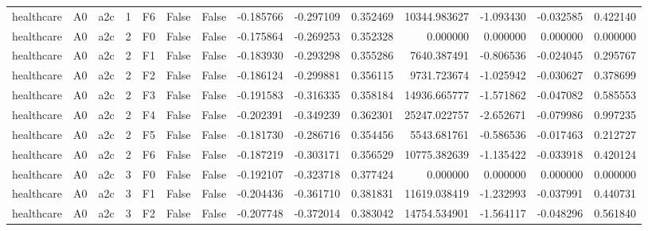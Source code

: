 \begin{tabular}{lllrlllrrrrrrr}
healthcare &      A0 &       a2c &     1 &  F6 &           False &            False & -0.185766 & -0.297109 & 0.352469 &     10344.983627 &          -1.093430 &       -0.032585 &            0.422140 \\
healthcare &      A0 &       a2c &     2 &  F0 &           False &            False & -0.175864 & -0.269253 & 0.352328 &         0.000000 &           0.000000 &        0.000000 &            0.000000 \\
healthcare &      A0 &       a2c &     2 &  F1 &           False &            False & -0.183930 & -0.293298 & 0.355286 &      7640.387491 &          -0.806536 &       -0.024045 &            0.295767 \\
healthcare &      A0 &       a2c &     2 &  F2 &           False &            False & -0.186124 & -0.299881 & 0.356115 &      9731.723674 &          -1.025942 &       -0.030627 &            0.378699 \\
healthcare &      A0 &       a2c &     2 &  F3 &           False &            False & -0.191583 & -0.316335 & 0.358184 &     14936.665777 &          -1.571862 &       -0.047082 &            0.585553 \\
healthcare &      A0 &       a2c &     2 &  F4 &           False &            False & -0.202391 & -0.349239 & 0.362301 &     25247.022757 &          -2.652671 &       -0.079986 &            0.997235 \\
healthcare &      A0 &       a2c &     2 &  F5 &           False &            False & -0.181730 & -0.286716 & 0.354456 &      5543.681761 &          -0.586536 &       -0.017463 &            0.212727 \\
healthcare &      A0 &       a2c &     2 &  F6 &           False &            False & -0.187219 & -0.303171 & 0.356529 &     10775.382639 &          -1.135422 &       -0.033918 &            0.420124 \\
healthcare &      A0 &       a2c &     3 &  F0 &           False &            False & -0.192107 & -0.323718 & 0.377424 &         0.000000 &           0.000000 &        0.000000 &            0.000000 \\
healthcare &      A0 &       a2c &     3 &  F1 &           False &            False & -0.204436 & -0.361710 & 0.381831 &     11619.038419 &          -1.232993 &       -0.037991 &            0.440731 \\
healthcare &      A0 &       a2c &     3 &  F2 &           False &            False & -0.207748 & -0.372014 & 0.383042 &     14754.534901 &          -1.564117 &       -0.048296 &            0.561840 \\

\end{tabular}
